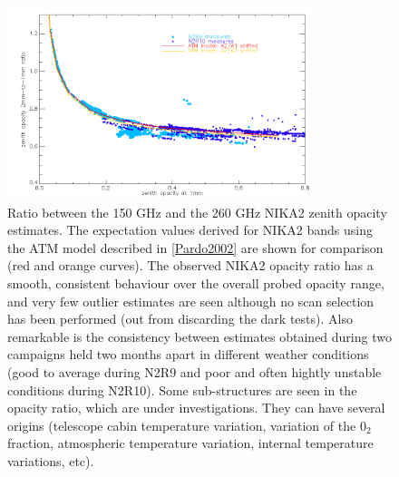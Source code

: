 \begin{figure}[ht]
\begin{center}
  \includegraphics[width=0.8\textwidth]{Figures/opacity_tau1_tau2_byrun_ratio_N2R9_N2R10.png}
  \caption{Ratio between the 150 GHz and the 260 GHz NIKA2 zenith opacity
estimates. The expectation values derived for NIKA2 bands
using the ATM model described in \ref{Pardo2002} are shown for
comparison (red and orange curves). The observed NIKA2 opacity ratio
has a smooth, consistent behaviour over the overall probed opacity range,
and very few outlier estimates are seen although no scan selection has
been performed (out from discarding the dark tests). Also remarkable
is the consistency between estimates obtained during two campaigns
held two months apart in different weather conditions (good to average
during N2R9 and poor and often hightly unstable conditions during
N2R10). Some sub-structures are seen in the opacity ratio, which are
under investigations. They can have several origins (telescope cabin
temperature variation, variation of the $0_2$ fraction, atmospheric
temperature variation, internal temperature variations, etc).  
  }
  \label{fig:opacity_ratio_perrun}
\end{center}
\end{figure}


